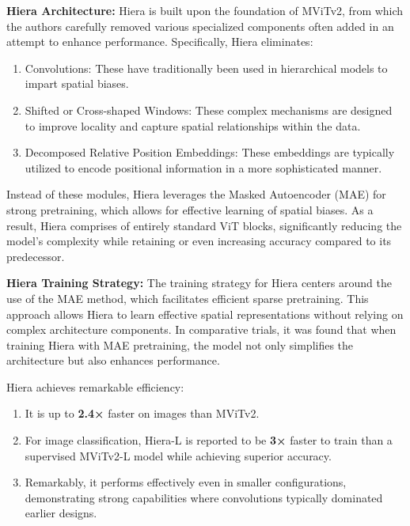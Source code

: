 \documentclass{article} %
\begin{document}
{\bf Hiera Architecture:}
Hiera is built upon the foundation of MViTv2, from which the authors carefully removed various specialized components often added in an attempt to enhance performance. Specifically, Hiera eliminates:
\begin{enumerate}
   \item Convolutions: These have traditionally been used in hierarchical models to impart spatial biases.
   \item Shifted or Cross-shaped Windows: These complex mechanisms are designed to improve locality and capture spatial relationships within the data.
   \item Decomposed Relative Position Embeddings: These embeddings are typically utilized to encode positional information in a more sophisticated manner.
\end{enumerate}

Instead of these modules, Hiera leverages the Masked Autoencoder (MAE) for strong pretraining, which allows for effective learning of spatial biases. As a result, Hiera comprises of entirely standard ViT blocks, significantly reducing the model's complexity while retaining or even increasing accuracy compared to its predecessor.

{\bf Hiera Training Strategy:}
The training strategy for Hiera centers around the use of the MAE method, which facilitates efficient sparse pretraining. This approach allows Hiera to learn effective spatial representations without relying on complex architecture components. In comparative trials, it was found that when training Hiera with MAE pretraining, the model not only simplifies the architecture but also enhances performance.

Hiera achieves remarkable efficiency:
\begin{enumerate}
   \item It is up to {\bf 2.4×} faster on images than MViTv2.
   \item For image classification, Hiera-L is reported to be {\bf 3×} faster to train than a supervised MViTv2-L model while achieving superior accuracy.
   \item Remarkably, it performs effectively even in smaller configurations, demonstrating strong capabilities where convolutions typically dominated earlier designs.
\end{enumerate}
\end{document}
